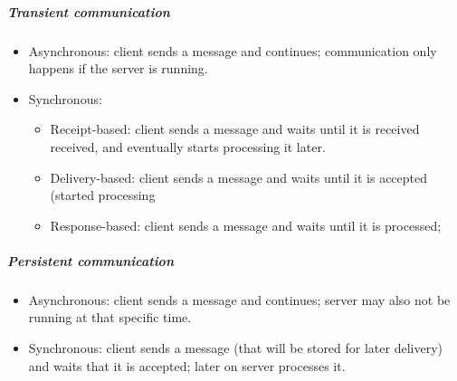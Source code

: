\documentclass[10pt,a4paper]{article}
\begin{document}
\subparagraph{Transient communication}
\begin{itemize}
	\item Asynchronous: client sends a message and continues; communication only happens if the server is running.
	\item Synchronous: 
	\begin{itemize}
		\item Receipt-based: client sends a message and waits until it is received received, and eventually starts processing it later.
	\item Delivery-based: client sends a message and waits until it is accepted (started processing
	\item Response-based: client sends a message and waits until it is processed; 
	\end{itemize}
\end{itemize}
\subparagraph{Persistent communication}
\begin{itemize}
	\item Asynchronous: client sends a message and continues; server may also not be running at that specific time.
	\item Synchronous: client sends a message (that will be stored for later delivery) and waits that it is accepted; later on server processes it.
\end{itemize}
\end{document}
